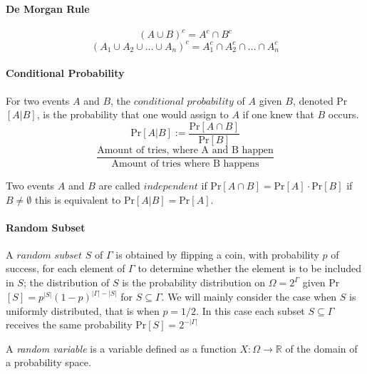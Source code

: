 \paragraph{De Morgan Rule}
$$ (A \cup B)^c = A^c \cap B^c $$ 
$$ (A_1 \cup A_2 \cup ... \cup A_n)^c = A_1^c \cap A_2^c \cap ... \cap A_n^c $$

\paragraph{Conditional Probability} $ $ \\
For two events $ A $ and $ B $, the $conditional$ $probability$ of $ A $ 
given $ B $, denoted Pr$[A|B]$, is the probability that one would assign
to $ A $ if one knew that $ B $ occurs.
$$ \text{Pr}[A|B] := \frac{\text{Pr}[A \cap B]}{\text{Pr}[B]} $$
$$ \frac{\text{Amount of tries, where A and B happen}}{\text{Amount of tries where B happens}} $$

\bigskip \noindent
Two events $ A $ and $ B $ are called $independent$ if Pr$[A \cap B] 
= \text{Pr}[A] \cdot \text{Pr}[B]$ if $ B \neq \emptyset $ this is 
equivalent to $ \text{Pr}[A|B] = \text{Pr}[A]$.

\paragraph{Random Subset}
A $random$ $subset$ $ S $ of $ \Gamma $ is obtained by flipping a coin, 
with probability $ p $ of success, for each element of $ \Gamma $ 
to determine whether the element is to be included in $ S $; the 
distribution of $ S $ is the probability distribution on $ \Omega = 2^\Gamma $
given Pr$[S] = p^{|S|}(1-p)^{|\Gamma| - |S|} $ for $ S \subseteq \Gamma $.
We will mainly consider the case when $ S $ is uniformly distributed, that is 
when $ p = 1/2$. In this case each subset $ S \subseteq \Gamma $ receives 
the same probability Pr$[S] = 2^{-|\Gamma|} $ 

\smallskip 
A \textit{random variable} is a variable defined as a function 
$ X: \Omega \to \mathbb{R} $ of the domain of a probability space.